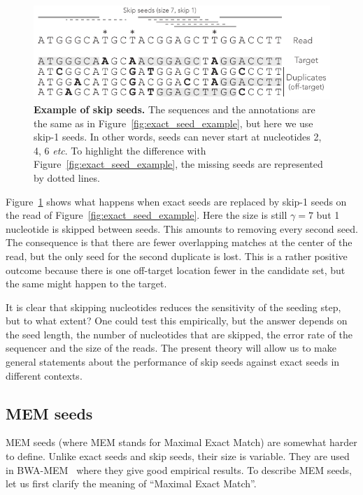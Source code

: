 \documentclass{article}
\begin{document}
\begin{figure}[h]
\centering
\includegraphics[scale=1]{skip_seed_example.pdf}
\caption{\textbf{Example of skip seeds.}
The sequences and the annotations are the same as in
Figure~\ref{fig:exact_seed_example}, but here we use skip-1 seeds. In other
words, seeds can never start at nucleotides 2, 4, 6 \textit{etc}. To
highlight the difference with Figure~\ref{fig:exact_seed_example}, the
missing seeds are represented by dotted lines.}
\label{fig:skip_seed_example}
\end{figure}

Figure~\ref{fig:skip_seed_example} shows what happens when exact seeds are
replaced by skip-1 seeds on the read of Figure~\ref{fig:exact_seed_example}.
Here the size is still $\gamma=7$ but 1 nucleotide is skipped between
seeds. This amounts to removing every second seed. The consequence is that
there are fewer overlapping matches at the center of the read, but the
only seed for the second duplicate is lost. This is a rather positive
outcome because there is one off-target location fewer in the candidate
set, but the same might happen to the target.

It is clear that skipping nucleotides reduces the sensitivity of the
seeding step, but to what extent? One could test this empirically, but the
answer depends on the seed length, the number of nucleotides that are
skipped, the error rate of the sequencer and the size of the reads. The
present theory will allow us to make general statements about the
performance of skip seeds against exact seeds in different contexts.


\subsection{MEM seeds}

MEM seeds (where MEM stands for Maximal Exact Match) are somewhat harder
to define. Unlike exact seeds and skip seeds, their size is variable. They
are used in BWA-MEM~\cite{li2013aligning} where they give good empirical
results. To describe MEM seeds, let us first clarify the meaning of
``Maximal Exact Match''.
\end{document}
